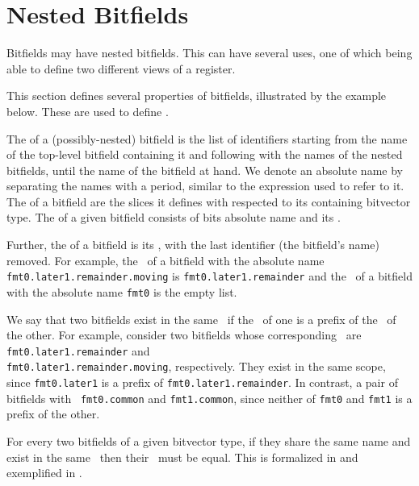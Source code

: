 \section{Nested Bitfields\label{sec:Nested Bitfields}}
Bitfields may have nested bitfields. This can have several uses, one of which being able to define two
different views of a register.

This section defines several properties of bitfields, illustrated by the example below.
These are used to define .

The \hypertarget{def-absolutename}{\absolutename} of a (possibly-nested) bitfield is the list of identifiers starting from the
name of the top-level bitfield containing it and following with the names of the nested bitfields,
until the name of the bitfield at hand. We denote an absolute name by separating the names with a
period, similar to the expression used to refer to it.
%
The \hypertarget{def-absoluteslice}{\absoluteslice} of a bitfield are the slices it defines with respected to its containing
bitvector type.
%
The \hypertarget{def-absolutebitfield}{\absolutebitfield} of a given bitfield consists of bits absolute name and its
\absoluteslices.

Further, the \hypertarget{def-bitfieldscope}{\bitfieldscope} of a bitfield is its \absolutename, with the last
identifier (the bitfield's name) removed.
For example, the \bitfieldscope\ of a bitfield with the absolute name \texttt{fmt0.later1.remainder.moving}
is \texttt{fmt0.later1.remainder} and the \bitfieldscope\ of a bitfield with the absolute name
\texttt{fmt0} is the empty list.

We say that two bitfields exist in the same \bitfieldscope\ if the \bitfieldscope\ of one is a prefix
of the \bitfieldscope\ of the other. For example, consider two bitfields whose corresponding \absolutenames\ are
\texttt{fmt0.later1.remainder} and \\
\texttt{fmt0.later1.remainder.moving}, respectively.
They exist in the same scope, since \texttt{fmt0.later1} is a prefix of
\texttt{fmt0.later1.remainder}.
In contrast, a pair of bitfields with \absolutenames\ \texttt{fmt0.common}
and \texttt{fmt1.common}, since neither of \texttt{fmt0} and \texttt{fmt1} is a prefix of the other.

For every two bitfields of a given bitvector type,
if they share the same name and exist in the same \bitfieldscope\ then their \absoluteslices\ must be
equal.
This is formalized in  and exemplified in .

